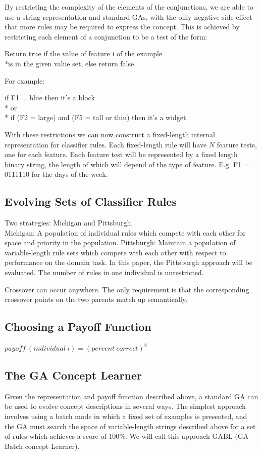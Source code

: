 \documentclass[12pt]{book}
\begin{document}
By restricting the complexity of the elements of the conjunctions, we are able to use a string representation and standard GAs, with the only negative side effect that more rules may be required to express the concept. This is achieved by restricting each element of a conjunction to be a test of the form:
\begin{center}
Return true if the value of feature i of the example\\*is in the given value set, else return false.
\end{center}
For example:
\begin{center}
if F1 = blue then it's a block\\*
or\\*
if (F2 = large) and (F5 = tall or thin) then it's a widget
\end{center}
With these restrictions we can now construct a fixed-length internal representation for classifier rules. Each fixed-length rule will have $N$ feature tests, one for each feature. Each feature test will be represented by a fixed length binary string, the length of which will depend of the type of feature. E.g. F1 = 0111110 for the days of the week.

\subsection{Evolving Sets of Classifier Rules}
Two strategies: Michigan and Pittsburgh.\\
Michigan: A population of individual rules which compete with each other for space and priority in the population. Pittsburgh: Maintain a population of variable-length rule sets which compete with each other with respect to performance on the domain task. In this paper, the Pittsburgh approach will be evaluated. The number of rules in one individual is unrestricted.

Crossover can occur anywhere. The only requirement is that the corresponding crossover points on the two parents match up semantically.

\subsection{Choosing a Payoff Function}
\begin{center}
$payoff\ (individual\ i) = (percent\ correct)^2$
\end{center}

\subsection{The GA Concept Learner}
Given the representation and payoff function described above, a standard GA can be used to evolve concept descriptions in several ways. The simplest approach involves using a batch mode in which a fixed set of examples is presented, and the GA must search the space of variable-length strings described above for a set of rules which achieves a score of $100\%$. We will call this approach GABL (GA Batch concept Learner).
\end{document}
